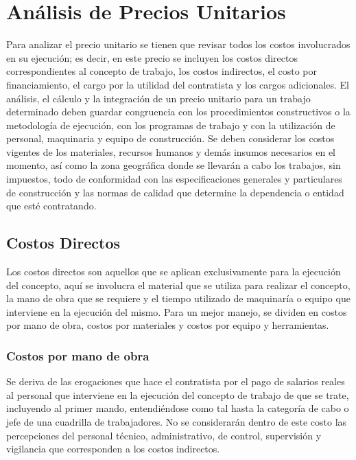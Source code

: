 \section{Análisis de Precios Unitarios}
Para analizar el precio unitario se tienen que revisar todos los costos involucrados en su ejecución; es decir, en este precio se incluyen los costos directos correspondientes al concepto de trabajo, los costos indirectos, el costo por financiamiento, el cargo por la utilidad del contratista y los cargos adicionales. El análisis, el cálculo y la integración de un precio unitario para un trabajo determinado deben guardar congruencia con los procedimientos constructivos o la metodología de ejecución, con los programas de trabajo y con la utilización de personal, maquinaria y equipo de construcción. Se deben considerar los costos vigentes de los materiales, recursos humanos y demás insumos necesarios en el momento, así como la zona geográfica donde se llevarán a cabo los trabajos, sin impuestos, todo de conformidad con las especificaciones generales y particulares de construcción y las normas de calidad que determine la dependencia o entidad que esté contratando.

\subsection{Costos Directos}
Los costos directos son aquellos que se aplican exclusivamente para la ejecución del concepto, aquí se involucra el material que se utiliza para realizar el concepto, la mano de obra que se requiere y el tiempo utilizado de maquinaría o equipo que interviene en la ejecución del mismo. Para un mejor manejo, se dividen en costos por mano de obra, costos por materiales y costos por equipo y herramientas.

\subsubsection{Costos por mano de obra}
Se deriva de las erogaciones que hace el contratista por el pago de salarios reales al personal que interviene en la ejecución del concepto de trabajo de que se trate, incluyendo al primer mando, entendiéndose como tal hasta la categoría de cabo o jefe de una cuadrilla de trabajadores. No se considerarán dentro de este costo las percepciones del personal técnico, administrativo, de control, supervisión y vigilancia que corresponden a los costos indirectos.

